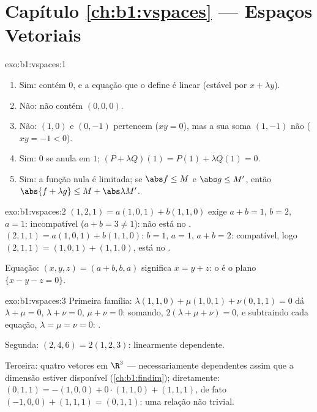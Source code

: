 \section*{Capítulo \ref{ch:b1:vspaces} --- Espaços Vetoriais}

\begin{solution}{exo:b1:vspaces:1}
\begin{enumerate}
  \item Sim: contém $0$, e a equação que o define é linear
        (estável por $x + \lambda y$).
  \item Não: não contém $(0,0,0)$.
  \item Não: $(1, 0)$ e $(0, -1)$ pertencem ($xy = 0$), mas a sua
        soma $(1,
        -1)$ não ($xy = -1 < 0$).
  \item Sim: $0$ se anula em $1$; $(P + \lambda Q)(1) = P(1) +
        \lambda Q(1) = 0$.
  \item Sim: a função nula é limitada; se $\abs f \leq M$ e
        $\abs g \leq M'$, então $\abs{f + \lambda g} \leq M +
        \abs\lambda M'$.
\end{enumerate}
\end{solution}

\begin{solution}{exo:b1:vspaces:2}
$(1,2,1) = a(1,0,1) + b(1,1,0)$ exige $a + b = 1$, $b = 2$, $a =
1$: incompatível ($a + b = 3 \neq 1$): não está no . $(2,1,1) =
a(1,0,1) + b(1,1,0)$:
$b = 1$, $a = 1$, $a + b = 2$: compatível, logo
$(2,1,1) = (1,0,1) + (1,1,0)$, está no .

Equação: $(x, y, z) = (a + b, b, a)$ significa $x = y + z$: o  é
o plano $\{x - y - z = 0\}$.
\end{solution}

\begin{solution}{exo:b1:vspaces:3}
Primeira família: $\lambda(1,1,0) + \mu(1,0,1) + \nu(0,1,1) = 0$ dá
$\lambda + \mu = 0$, $\lambda + \nu = 0$, $\mu + \nu = 0$: somando,
$2(\lambda + \mu + \nu) = 0$, e subtraindo cada equação,
$\lambda = \mu = \nu = 0$: .

Segunda: $(2,4,6) = 2(1,2,3)$: linearmente dependente.

Terceira: quatro vetores em $\R^3$ --- necessariamente dependentes
assim que a dimensão estiver disponível (\cref{ch:b1:findim}); diretamente:
$(0,1,1) = -(1,0,0) +
0\cdot(1,1,0) + (1,1,1)$, de fato $(-1,0,0) + (1,1,1) = (0,1,1)$: uma relação não trivial.
\end{solution}

